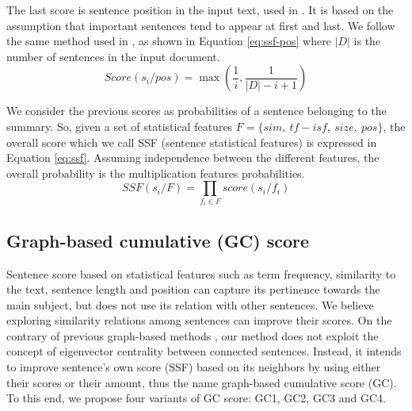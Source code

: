 \documentclass[12pt, oneside, a4paper]{article}
\begin{document}
The last score is sentence position in the input text, used in \citep{58-baxendale,69-edmundson}.
It is based on the assumption that important sentences tend to appear at first and last. 
We follow the same method used in \citep{04-nobata-sekine}, as shown in Equation \ref{eq:ssf-pos} where $ |D| $ is the number of sentences in the input document.
\begin{equation}
Score(s_i/ pos) = \max (\frac{1}{i}, \frac{1}{|D| - i + 1})
\label{eq:ssf-pos}
\end{equation}

We consider the previous scores as probabilities of a sentence belonging to the summary. 
So, given a set of statistical features $ F = \{ sim,\ tf-isf,\ size,\ pos \} $, the overall score which we call SSF (sentence statistical features) is expressed in Equation \ref{eq:ssf}.
Assuming independence between the different features, the overall probability is the multiplication features probabilities.
% 
\begin{equation}
SSF(s_i/ F) = \prod_{f_i \in F} score(s_i/f_i)
\label{eq:ssf}
\end{equation}


\subsection{Graph-based cumulative (GC) score}

Sentence score based on statistical features such as term frequency, similarity to the text, sentence length and position can capture its pertinence towards the main subject, but does not use its relation with other sentences.
We believe exploring similarity relations among sentences can improve their scores.
On the contrary of previous graph-based methods \citep{04-mihalcea-tarau,04-erkan-radev}, our method does not exploit the concept of eigenvector centrality between connected sentences. 
Instead, it intends to improve sentence's own score (SSF) based on its neighbors by using either their scores or their amount, thus the name graph-based cumulative score (GC).
To this end, we propose four variants of GC score: GC1, GC2, GC3 and GC4. 
\end{document}
